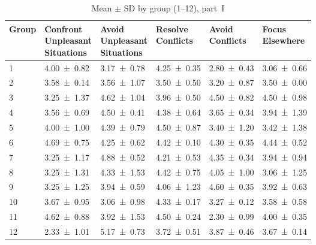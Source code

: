 \documentclass{article}
\begin{document}
\begin{table}[ht]
\centering
\caption{Mean \(\pm\) SD by group (1–12), part I}
\label{tab:group_stats_part1}
\begin{tabular}{l*{5}{p{2.5cm}}}
\toprule
   Group  & 
\makecell[l]{Confront \\ Unpleasant \\ Situations} & 
\makecell[l]{Avoid \\ Unpleasant \\ Situations} & 
\makecell[l]{Resolve \\ Conflicts} & 
\makecell[l]{Avoid \\ Conflicts} & 
\makecell[l]{Focus \\ Elsewhere} \\
\midrule
1  & 4.00 ± 0.82 & 3.17 ± 0.78 & 4.25 ± 0.35 & 2.80 ± 0.43 & 3.06 ± 0.66 \\
2  & 3.58 ± 0.14 & 3.56 ± 1.07 & 3.50 ± 0.50 & 3.20 ± 0.87 & 3.50 ± 0.00 \\
3  & 3.25 ± 1.37 & 4.62 ± 1.04 & 3.96 ± 0.50 & 4.50 ± 0.82 & 4.50 ± 0.98 \\
4  & 3.56 ± 0.69 & 4.50 ± 0.41 & 4.38 ± 0.64 & 3.65 ± 0.34 & 3.94 ± 1.39 \\
5  & 4.00 ± 1.00 & 4.39 ± 0.79 & 4.50 ± 0.87 & 3.40 ± 1.20 & 3.42 ± 1.38 \\
6  & 4.69 ± 0.75 & 4.25 ± 0.62 & 4.42 ± 0.10 & 4.30 ± 0.35 & 4.44 ± 0.52 \\
7  & 3.25 ± 1.17 & 4.88 ± 0.52 & 4.21 ± 0.53 & 4.35 ± 0.34 & 3.94 ± 0.94 \\
8  & 3.25 ± 1.31 & 4.33 ± 1.53 & 4.42 ± 0.75 & 4.05 ± 1.00 & 3.06 ± 1.25 \\
9  & 3.25 ± 1.25 & 3.94 ± 0.59 & 4.06 ± 1.23 & 4.60 ± 0.35 & 3.92 ± 0.63 \\
10 & 3.67 ± 0.95 & 3.06 ± 0.98 & 4.33 ± 0.17 & 3.27 ± 0.12 & 3.58 ± 0.58 \\
11 & 4.62 ± 0.88 & 3.92 ± 1.53 & 4.50 ± 0.24 & 2.30 ± 0.99 & 4.00 ± 0.35 \\
12 & 2.33 ± 1.01 & 5.17 ± 0.73 & 3.72 ± 0.51 & 3.87 ± 0.46 & 3.67 ± 0.14 \\
\bottomrule
\end{tabular}
\end{table}
\end{document}

